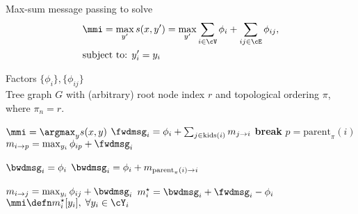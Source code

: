 

\begin{algorithm} 
\caption[max-sum inference]{Max-sum message passing to solve 
\begin{align}
&\mmi =  \max_{y'} s(x,y') = \max_{y'} \sum_{i \in \cV} \phi_i + \sum_{ij \in \cE} \phi_{ij}, \\
&\text{subject to: } y_i' = y_i
\end{align}
} 
\label{alg:mm-inference} 
\begin{algorithmic} 

\REQUIRE $ $ \\ 
Factors $\{\phi_i\}, \{\phi_{ij}\}$\\
Tree graph $G$ with (arbitrary) root node index $r$ and topological ordering $\pi$, where $\pi_n = r$.

\ENSURE $\mmi = \argmax_{y} s(x,y)$ 
\STATE
$\fwdmsg_i = \phi_i + \sum_{j \in \text{kids}(i)} m_{j \rightarrow i}$
 \STATE \textbf{break} \ENDIF
\STATE
$p = \text{parent}_\pi(i) $
\STATE
$m_{i \rightarrow p} = \max_{y_i} \phi_{ip} + \fwdmsg_i$
\ENDFOR


\STATE $\bwdmsg_i = \phi_i$
\ELSE
\STATE $\bwdmsg_i = \phi_i + m_{\text{parent}_\pi(i) \rightarrow i}$
\ENDIF

\STATE $m_{i \rightarrow j} = \max_{y_i} \phi_{ij} + \bwdmsg_i$
\ENDFOR
\STATE $m^\star_i = \bwdmsg_i + \fwdmsg_i - \phi_i$
\ENDFOR
\STATE $\mmi \defn m^\star_i[y_i],\; \forall y_i \in \cY_i$

\end{algorithmic} 
\end{algorithm}



